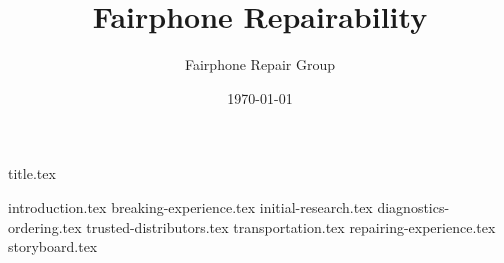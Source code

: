 \documentclass[final,a4paper]{report} %
\author{Fairphone Repair Group}
\title{Fairphone Repairability}
\date{\today}
\begin{document}

{title.tex}
\newpage
\tableofcontents

\newpage
{}
{introduction.tex}
{breaking-experience.tex}
{initial-research.tex}
{diagnostics-ordering.tex}
{trusted-distributors.tex}
{transportation.tex}
{repairing-experience.tex}
{storyboard.tex}


\printbibliography
\end{document}
